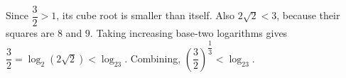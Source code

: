 Since $\dfrac{3}{2} > 1$, its cube root is smaller than itself. Also $2\sqrt2<3$, because their squares are $8$ and $9$. Taking increasing base-two logarithms gives $\dfrac{3}{2}=\log_2(2\sqrt2)<\log_23$. Combining, $\boxed{(\dfrac{3}{2})^{\dfrac{1}{3}} < \log_23}$.
